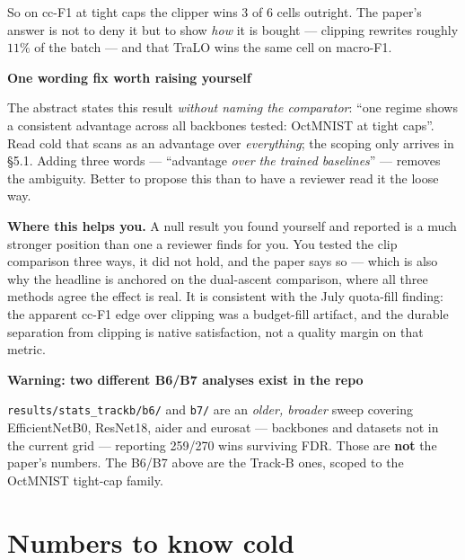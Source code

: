 \documentclass[11pt,a4paper]{article}
\newenvironment{callout}[1]
  {\par\medskip\noindent\begin{lrbox}{\calloutbox}%
   \begin{minipage}{\dimexpr\linewidth-20pt\relax}%
   \textbf{#1}\par\smallskip}
  {\end{minipage}\end{lrbox}%
   \setlength{\fboxsep}{10pt}%
   \colorbox{boxgrey}{\usebox{\calloutbox}}\par\medskip}
\begin{document}
\noindent So on cc-F1 at tight caps the clipper wins 3 of 6 cells outright. The paper's
answer is not to deny it but to show \emph{how} it is bought --- clipping rewrites roughly
$11\%$ of the batch --- and that TraLO wins the same cell on macro-F1.

\begin{callout}{One wording fix worth raising yourself}
The abstract states this result \emph{without naming the comparator}: ``one regime shows a
consistent advantage across all backbones tested: OctMNIST at tight caps''. Read cold that
scans as an advantage over \emph{everything}; the scoping only arrives in \S5.1. Adding
three words --- ``advantage \emph{over the trained baselines}'' --- removes the ambiguity.
Better to propose this than to have a reviewer read it the loose way.
\end{callout}

\noindent\textbf{Where this helps you.} A null result you found yourself and reported is a
much stronger position than one a reviewer finds for you. You tested the clip comparison
three ways, it did not hold, and the paper says so --- which is also why the headline is
anchored on the dual-ascent comparison, where all three methods agree the effect is real.
It is consistent with the July quota-fill finding: the apparent cc-F1 edge over clipping was
a budget-fill artifact, and the durable separation from clipping is native satisfaction, not
a quality margin on that metric.

\begin{callout}{Warning: two different B6/B7 analyses exist in the repo}
\texttt{results/stats\_trackb/b6/} and \texttt{b7/} are an \emph{older, broader} sweep
covering EfficientNetB0, ResNet18, aider and eurosat --- backbones and datasets not in the
current grid --- reporting 259/270 wins surviving FDR. Those are \textbf{not} the paper's
numbers. The B6/B7 above are the Track-B ones, scoped to the OctMNIST tight-cap family.
\end{callout}

\section{Numbers to know cold}
\end{document}
